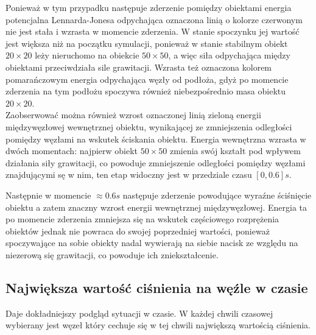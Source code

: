 \documentclass[12pt, letterpaper]{report}
\begin{document}
    Ponieważ w tym przypadku następuje zderzenie pomiędzy obiektami energia potencjalna Lennarda-Jonesa odpychająca
    oznaczona linią o kolorze czerwonym nie jest stała i wzrasta w momencie zderzenia. W stanie spoczynku jej wartość
    jest większa niż na początku symulacji, ponieważ w stanie stabilnym obiekt $20 \times 20$ leży nieruchomo na obiekcie
    $50 \times 50$, a więc siła odpychająca między obiektami przeciwdziała sile grawitacji. 
    Wzrasta też oznaczona kolorem pomarańczowym energia odpychająca węzły od podłoża, gdyż po momencie zderzenia na 
    tym podłożu spoczywa również niebezpośrednio masa  obiektu $20 \times 20$. \\
    
    Zaobserwować można również wzrost oznaczonej linią zieloną energii międzywęzłowej wewnętrznej obiektu, wynikającej ze 
    zmniejszenia odległości pomiędzy węzłami na wskutek ściskania obiektu. Energia wewnętrzna wzrasta w dwóch momentach: 
    najpierw obiekt $50 \times 50$ zmienia swój kształt pod wpływem działania siły grawitacji, co powoduje zmniejszenie 
    odległości pomiędzy węzłami znajdującymi sę w nim, ten etap widoczny jest w przedziale czasu $[0, 0.6] s$. 
    
    Następnie w momencie $\approx 0.6 s$ następuje zderzenie powodujące wyraźne ściśnięcie obiektu a zatem znaczny wzrost
    energii wewnętrznej międzywęzłowej. Energia ta po momencie zderzenia zmniejsza się na wskutek częściowego rozprężenia
    obiektów jednak nie powraca do swojej poprzedniej wartości, ponieważ spoczywające na sobie obiekty nadal 
    wywierają na siebie nacisk ze względu na niezerową się grawitacji, co powoduje ich zniekształcenie.

    \clearpage
    \subsection{Największa wartość ciśnienia na węźle w czasie}
    Daje dokładniejszy podgląd sytuacji w czasie. W każdej chwili czasowej wybierany jest węzeł 
    który cechuje się w tej chwili największą wartością ciśnienia.
\end{document}
